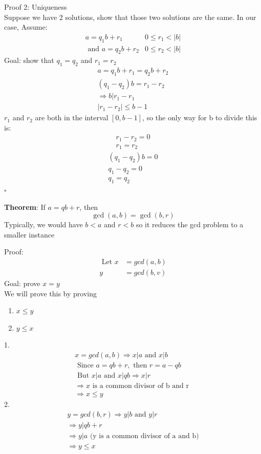 \documentclass{article}
\begin{document}
Proof 2: Uniqueness \\
Suppose we have 2 solutions, show that those two solutions are the same. In our case, Assume:
\begin{align*}
    a = q_1b+r_1              & 0 \le r_1 < \lvert b \rvert \\
    \text{ and } a = q_2b+r_2 & 0 \le r_2 < \lvert b \rvert
\end{align*}
Goal: show that $q_1 = q_2$ and $r_1 = r_2$
\begin{gather*}
    a = q_1b+r_1 = q_2b+r_2 \\
    (q_1 - q_2)b = r_1 - r_2 \\
    \Rightarrow b | r_1-r_1 \\
    \lvert r_1 - r_2 \rvert \le b-1
\end{gather*}
$r_1$ and $r_2$ are both in the interval $[0,b-1]$, so the only way for b to divide this is:
\begin{gather*}
    r_1 - r_2 = 0\\
    r_1 = r_2
\end{gather*}
\begin{gather*}
    (q_1 - q_2) b = 0 \\
    q_1 - q_2 = 0 \\
    q_1 = q_2
\end{gather*}
\hspace*{\fill} $\square$

\textbf{Theorem}: If $a=qb+r$, then \[
    \gcd(a,b) =
    \gcd(b,r)
\]
Typically, we would have $b<a$ and $r<b$ so it reduces the gcd problem to a smaller instance

Proof:
\begin{align*}
    \text{ Let } x & = gcd(a,b)  \\
    y              & = gcd (b,v)
\end{align*}
Goal: prove $x=y$ \\
We will prove this by proving
\begin{enumerate}
    \item $x \le y$
    \item $y \le x$
\end{enumerate}

1. \begin{gather*}
    x = gcd(a,b) \Rightarrow x|a \text{ and }  x|b \\
    \text{ Since } a = qb+r, \text{ then } r = a-qb \\
    \text{ But } x|a \text{ and } x|qb \Rightarrow x|r \\
    \Rightarrow x \text{ is a common divisor of b and r } \\
    \Rightarrow x \le y
\end{gather*}
2. \begin{gather*}
    y = gcd(b,r) \Rightarrow y|b \text{ and }  y|r \\
    \Rightarrow y|qb+r\\
    \Rightarrow y|a \text{ (y is a common divisor of a and b)} \\
    \Rightarrow y \le x
\end{gather*}
\end{document}

